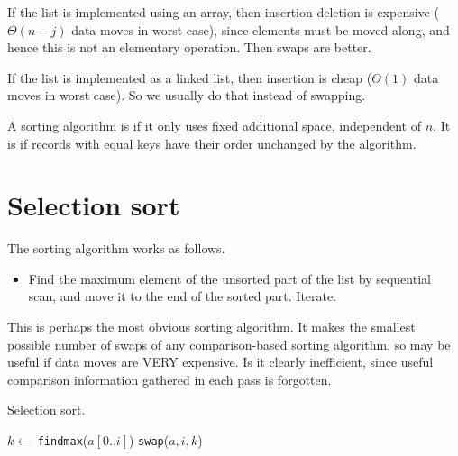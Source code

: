 If the list is implemented using an array, then insertion-deletion is expensive ($\Theta(n-j)$ data moves in worst case), 
since elements must be moved along, and hence this is not an elementary operation. Then swaps are better.

If the list is implemented as a linked list, then insertion is cheap ($\Theta(1)$ data moves in worst case).
So we usually do that instead of swapping.

\begin{Definition}
A sorting algorithm is  if it only uses fixed additional space, independent of $n$.
It is  if records with equal keys have their order unchanged by the algorithm.
\end{Definition}



\section{Selection sort} %
\label{sec:selectionsort}
The sorting algorithm  works as follows.
\begin{itemize} 
  \item Find the maximum element of the unsorted part of the list by sequential
  scan, and move it to the end of the sorted part. Iterate.
\end{itemize} 

This is perhaps the most obvious sorting algorithm. 
It makes the smallest possible number of swaps of any comparison-based sorting algorithm, 
so may be useful if data moves are VERY expensive.
Is it clearly inefficient, since useful comparison information gathered in each pass is forgotten.

\begin{algorithm}[H]
  \caption{Selection sort.}
    \label{alg:selsort}
\begin{algorithmic}[1]
	\State $k \gets $ \texttt{findmax}($a[0..i]$)
		\State \texttt{swap}($a,i,k$)
	\EndIf
\EndFor
\State {}
\EndFunction
\end{algorithmic}
\end{algorithm}

